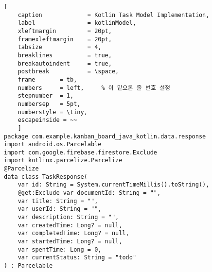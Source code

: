 \begin{lstlisting}[
	caption				= Kotlin Task Model Implementation,	
	label				= kotlinModel,         
	xleftmargin			= 20pt,
	framexleftmargin	= 20pt,
	tabsize				= 4,
	breaklines			= true,
	breakautoindent		= true,
	postbreak			= \space,
	frame		= tb,
	numbers		= left,		% 이 밑으론 줄 번호 설정
	stepnumber	= 1,
	numbersep	= 5pt,
	numberstyle	= \tiny,
	escapeinside = ~~
	]
package com.example.kanban_board_java_kotlin.data.response
import android.os.Parcelable
import com.google.firebase.firestore.Exclude
import kotlinx.parcelize.Parcelize
@Parcelize
data class TaskResponse(
    var id: String = System.currentTimeMillis().toString(),
    @get:Exclude var documentId: String = "",
    var title: String = "",
    var userId: String = "",
    var description: String = "",
    var createdTime: Long? = null,
    var completedTime: Long? = null,
    var startedTime: Long? = null,
    var spentTime: Long = 0,
    var currentStatus: String = "todo"
) : Parcelable
\end{lstlisting}